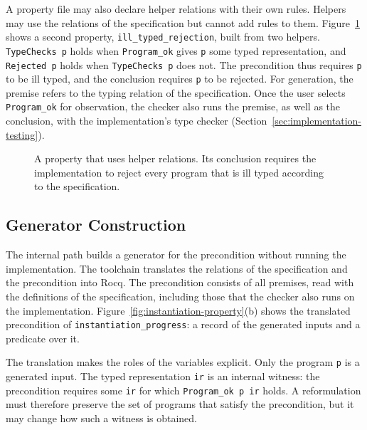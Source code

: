 A property file may also declare helper relations with their own rules.
Helpers may use the relations of the specification but cannot add rules to
them.
Figure~\ref{fig:rejection-helpers} shows a second property,
\texttt{ill\_typed\_rejection}, built from two helpers.
\texttt{TypeChecks p} holds when \texttt{Program\_ok} gives \texttt{p} some
typed representation, and \texttt{Rejected p} holds when \texttt{TypeChecks p}
does not.
The precondition thus requires \texttt{p} to be ill typed, and the conclusion
requires \texttt{p} to be rejected.
For generation, the premise refers to the typing relation of the
specification.
Once the user selects \texttt{Program\_ok} for observation, the checker also
runs the premise, as well as the conclusion, with the implementation's type
checker (Section~\ref{sec:implementation-testing}).

\begin{figure}[t]
  \centering
  
  \caption{A property that uses helper relations. Its conclusion requires the
    implementation to reject every program that is ill typed according to the
    specification.}
  \label{fig:rejection-helpers}
\end{figure}

\subsection{Generator Construction}
\label{sec:generator-verification}

The internal path builds a generator for the precondition without running the
implementation.
The toolchain translates the relations of the specification and the
precondition into Rocq.
The precondition consists of all premises, read with the definitions of the
specification, including those that the checker also runs on the
implementation.
Figure~\ref{fig:instantiation-property}(b) shows the translated precondition of
\texttt{instantiation\_progress}: a record of the generated inputs and a
predicate over it.

The translation makes the roles of the variables explicit.
Only the program \texttt{p} is a generated input.
The typed representation \texttt{ir} is an internal witness: the precondition
requires some \texttt{ir} for which \texttt{Program\_ok p ir} holds.
A reformulation must therefore preserve the set of programs that satisfy the
precondition, but it may change how such a witness is obtained.

